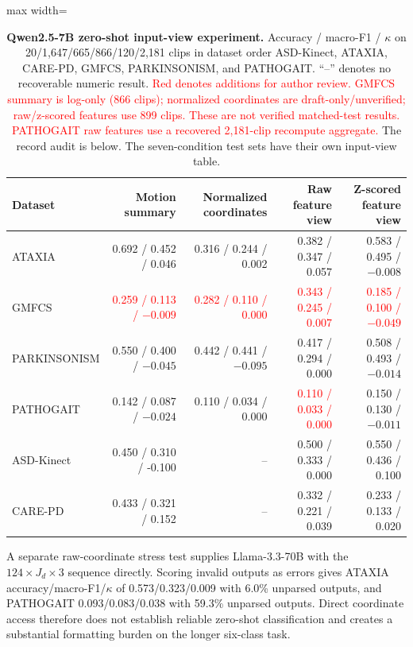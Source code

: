 \begin{table}[H]
\centering
\caption{\textbf{Qwen2.5-7B zero-shot input-view experiment.} Accuracy / macro-F1 / $\kappa$ on 20/1,647/665/866/120/2,181 clips in dataset order ASD-Kinect, ATAXIA, CARE-PD, GMFCS, PARKINSONISM, and PATHOGAIT. ``--'' denotes no recoverable numeric result. \textcolor{red}{Red denotes additions for author review. GMFCS summary is log-only (866 clips); normalized coordinates are draft-only/unverified; raw/z-scored features use 899 clips. These are not verified matched-test results. PATHOGAIT raw features use a recovered 2,181-clip recompute aggregate.} The record audit is below. The seven-condition test sets have their own input-view table.}
\label{tab:core_views}
\scriptsize
\begin{adjustbox}{max width=\textwidth}
\begin{tabular}{lrrrr}
\toprule
Dataset & Motion summary & Normalized coordinates &
Raw feature view & Z-scored feature view \\
\midrule
ATAXIA & 0.692 / 0.452 / 0.046 & 0.316 / 0.244 / 0.002 & 0.382 / 0.347 / 0.057 & 0.583 / 0.495 / $-0.008$ \\
GMFCS & \textcolor{red}{0.259 / 0.113 / $-0.009$} & \textcolor{red}{0.282 / 0.110 / 0.000} & \textcolor{red}{0.343 / 0.245 / 0.007} & \textcolor{red}{0.185 / 0.100 / $-0.049$} \\
PARKINSONISM & 0.550 / 0.400 / $-0.045$ & 0.442 / 0.441 / $-0.095$ & 0.417 / 0.294 / 0.000 & 0.508 / 0.493 / $-0.014$ \\
PATHOGAIT & 0.142 / 0.087 / $-0.024$ & 0.110 / 0.034 / 0.000 & \textcolor{red}{0.110 / 0.033 / 0.000} & 0.150 / 0.130 / $-0.011$ \\
ASD-Kinect & 0.450 / 0.310 / -0.100 & -- & 0.500 / 0.333 / 0.000 & 0.550 / 0.436 / 0.100 \\
CARE-PD & 0.433 / 0.321 / 0.152 & -- & 0.332 / 0.221 / 0.039 & 0.233 / 0.133 / 0.020 \\
\bottomrule
\end{tabular}
\end{adjustbox}
\end{table}

A separate raw-coordinate stress test supplies Llama-3.3-70B with the $124\times J_d\times3$ sequence directly. Scoring invalid outputs as errors gives ATAXIA accuracy/macro-F1/$\kappa$ of 0.573/0.323/0.009 with 6.0\% unparsed outputs, and PATHOGAIT 0.093/0.083/0.038 with 59.3\% unparsed outputs. Direct coordinate access therefore does not establish reliable zero-shot classification and creates a substantial formatting burden on the longer six-class task.

